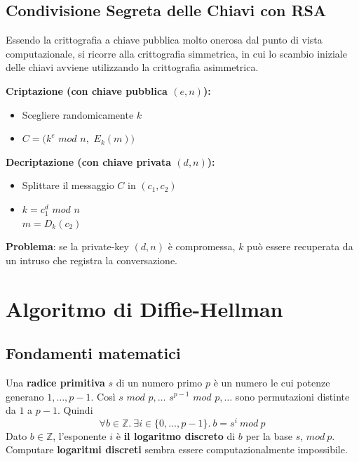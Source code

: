 \documentclass[11pt, a4paper, twoside, italian]{report}
\theoremstyle{plain}
\begin{document}
\subsection*{Condivisione Segreta delle Chiavi con RSA}
Essendo la crittografia a chiave pubblica molto onerosa dal punto di vista computazionale, si ricorre alla crittografia simmetrica, in cui lo scambio iniziale delle chiavi avviene utilizzando la crittografia asimmetrica.
\begin{multicols}{2}
\noindent
\textbf{Criptazione (con chiave pubblica $(e, n)$):}
\begin{itemize}
	\item Scegliere randomicamente $k$
	\item $C = (k^{e}$ $mod$ $n,$ $E_{k}(m))$
\end{itemize}
\columnbreak
\noindent
\textbf{Decriptazione (con chiave privata $(d, n)$):}
\begin{itemize}
	\item Splittare il messaggio $C$ in $(c_{1}, c_{2})$
	\item $k = c_{1}^{d}$ $mod$ $n$ \\
	$m = D_{k}(c_{2})$
\end{itemize}
\end{multicols}
\noindent
\textbf{Problema}: se la private-key $(d, n)$ è compromessa, $k$ può essere recuperata da un intruso che registra la conversazione.

\section*{Algoritmo di Diffie-Hellman}

\subsection*{Fondamenti matematici}
Una \textbf{radice primitiva} $s$ di un numero primo $p$ è un numero le cui potenze generano $1, \dots, p-1$. Così $s$ $mod$ $p, \dots$ $s^{p-1}$ $mod$ $p, \dots$ sono permutazioni distinte da $1$ a $p-1$. Quindi \[ \forall b \in \mathbb{Z}.\ \exists i \in \{0, \dots, p-1\}.\ b = s^{i}\ mod\ p \]
Dato $b \in \mathbb{Z}$, l'esponente $i$ è \textbf{il logaritmo discreto} di $b$ per la base $s$, $mod\ p$. Computare \textbf{logaritmi discreti} sembra essere computazionalmente impossibile.
\end{document}
